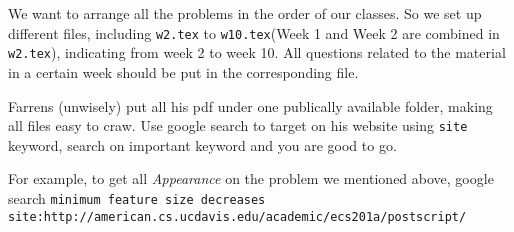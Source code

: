 
We want to arrange all the problems in the order of our classes.
So we set up different files, including \texttt{w2.tex} to \texttt{w10.tex}(Week 1 and Week 2 are combined in \texttt{w2.tex}), indicating from week 2 to week 10.
All questions related to the material in a certain week should be put in the corresponding file.


Farrens (unwisely) put all his pdf under one publically available folder, making all files easy to craw.
Use google search to target on his website using \texttt{site} keyword, search on important keyword and you are good to go.

For example, to get all \textit{Appearance} on the problem we mentioned above, google search \texttt{minimum feature size decreases site:http://american.cs.ucdavis.edu/academic/ecs201a/postscript/}
